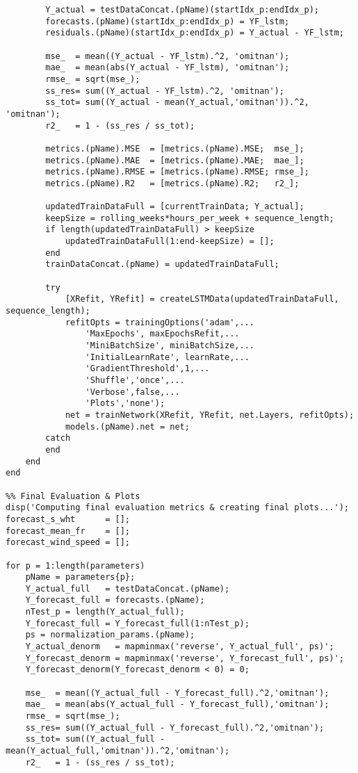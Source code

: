 \begin{verbatim}
        Y_actual = testDataConcat.(pName)(startIdx_p:endIdx_p);
        forecasts.(pName)(startIdx_p:endIdx_p) = YF_lstm;
        residuals.(pName)(startIdx_p:endIdx_p) = Y_actual - YF_lstm;
        
        mse_  = mean((Y_actual - YF_lstm).^2, 'omitnan');
        mae_  = mean(abs(Y_actual - YF_lstm), 'omitnan');
        rmse_ = sqrt(mse_);
        ss_res= sum((Y_actual - YF_lstm).^2, 'omitnan');
        ss_tot= sum((Y_actual - mean(Y_actual,'omitnan')).^2, 'omitnan');
        r2_   = 1 - (ss_res / ss_tot);
        
        metrics.(pName).MSE  = [metrics.(pName).MSE;  mse_];
        metrics.(pName).MAE  = [metrics.(pName).MAE;  mae_];
        metrics.(pName).RMSE = [metrics.(pName).RMSE; rmse_];
        metrics.(pName).R2   = [metrics.(pName).R2;   r2_];
        
        updatedTrainDataFull = [currentTrainData; Y_actual];
        keepSize = rolling_weeks*hours_per_week + sequence_length;
        if length(updatedTrainDataFull) > keepSize
            updatedTrainDataFull(1:end-keepSize) = [];
        end
        trainDataConcat.(pName) = updatedTrainDataFull;
        
        try
            [XRefit, YRefit] = createLSTMData(updatedTrainDataFull, sequence_length);
            refitOpts = trainingOptions('adam',...
                'MaxEpochs', maxEpochsRefit,...
                'MiniBatchSize', miniBatchSize,...
                'InitialLearnRate', learnRate,...
                'GradientThreshold',1,...
                'Shuffle','once',...
                'Verbose',false,...
                'Plots','none');
            net = trainNetwork(XRefit, YRefit, net.Layers, refitOpts);
            models.(pName).net = net;
        catch
        end
    end
end

%% Final Evaluation & Plots
disp('Computing final evaluation metrics & creating final plots...');
forecast_s_wht      = [];
forecast_mean_fr    = [];
forecast_wind_speed = [];

for p = 1:length(parameters)
    pName = parameters{p};
    Y_actual_full   = testDataConcat.(pName);
    Y_forecast_full = forecasts.(pName);
    nTest_p = length(Y_actual_full);
    Y_forecast_full = Y_forecast_full(1:nTest_p);
    ps = normalization_params.(pName);
    Y_actual_denorm   = mapminmax('reverse', Y_actual_full', ps)';
    Y_forecast_denorm = mapminmax('reverse', Y_forecast_full', ps)';
    Y_forecast_denorm(Y_forecast_denorm < 0) = 0;
    
    mse_  = mean((Y_actual_full - Y_forecast_full).^2,'omitnan');
    mae_  = mean(abs(Y_actual_full - Y_forecast_full),'omitnan');
    rmse_ = sqrt(mse_);
    ss_res= sum((Y_actual_full - Y_forecast_full).^2,'omitnan');
    ss_tot= sum((Y_actual_full - mean(Y_actual_full,'omitnan')).^2,'omitnan');
    r2_   = 1 - (ss_res / ss_tot);
    

\end{verbatim}
